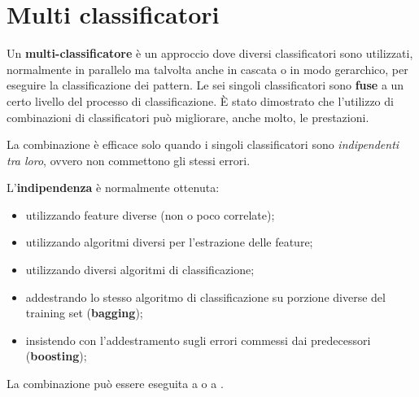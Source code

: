 \section{Multi classificatori}\label{sub:multi_classificatori} %
Un \textbf{multi-classificatore} è un approccio dove diversi classificatori sono utilizzati, normalmente in parallelo ma talvolta anche in cascata o in modo gerarchico, per eseguire la classificazione dei pattern.
Le  sei singoli classificatori sono \textbf{fuse} a un certo livello del processo di classificazione.
\emptyln{}
È stato dimostrato che l'utilizzo di combinazioni di classificatori può migliorare, anche molto, le prestazioni.
\begin{warning}
    La combinazione è efficace solo quando i singoli classificatori sono \textit{indipendenti tra loro}, ovvero non commettono gli stessi errori.
\end{warning}
L'\textbf{indipendenza} è normalmente ottenuta:
\begin{itemize}
    \item utilizzando feature diverse (non o poco correlate);
    \item utilizzando algoritmi diversi per l'estrazione delle feature;
    \item utilizzando diversi algoritmi di classificazione;
    \item addestrando lo stesso algoritmo di classificazione su porzione diverse del training set (\textbf{bagging});
    \item insistendo con l'addestramento sugli errori commessi dai predecessori (\textbf{boosting});
\end{itemize}
La combinazione può essere eseguita a  o a .
%
